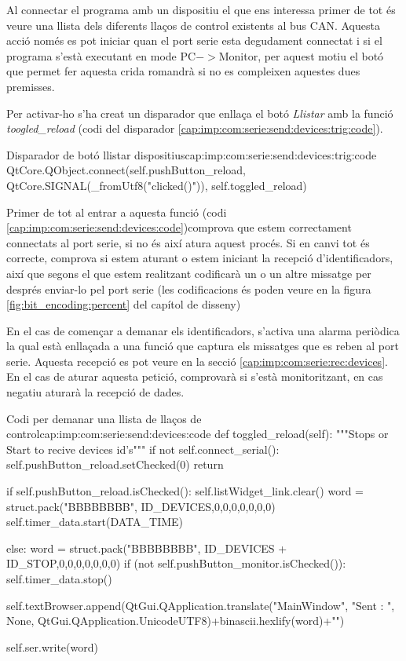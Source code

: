 Al connectar el programa \DCSMonitor amb un dispositiu \Monitor el que ens interessa primer de tot és veure una llista dels diferents llaços de control existents al bus CAN. Aquesta acció només es pot iniciar quan el port serie esta degudament connectat i si el programa s'està executant en mode PC$->$Monitor, per aquest motiu el botó que permet fer aquesta crida romandrà si no es compleixen aquestes dues premisses.

Per activar-ho s'ha creat un disparador que enllaça el botó \emph{Llistar} amb la funció \emph{toogled\_reload} (codi del disparador \ref{cap:imp:com:serie:send:devices:trig:code}).

\begin{code_python}{Disparador de botó llistar dispositius}{cap:imp:com:serie:send:devices:trig:code}
QtCore.QObject.connect(self.pushButton_reload, QtCore.SIGNAL(_fromUtf8("clicked()")), self.toggled_reload)
\end{code_python}

Primer de tot al entrar a aquesta funció (codi \ref{cap:imp:com:serie:send:devices:code})comprova que estem correctament connectats al port serie, si no és així atura aquest procés. Si en canvi tot és correcte, comprova si estem aturant o estem iniciant la recepció d'identificadors, així que segons el que estem realitzant codificarà un o un altre missatge per després enviar-lo pel port serie (les codificacions és poden veure en la figura \ref{fig:bit_encoding:percent} del capítol de disseny)

En el cas de començar a demanar els identificadors, s'activa una alarma periòdica la qual està enllaçada a una funció que captura els missatges que es reben al port serie. Aquesta recepció es pot veure en la secció \ref{cap:imp:com:serie:rec:devices}.
En el cas de aturar aquesta petició, comprovarà si s'està monitoritzant, en cas negatiu aturarà la recepció de dades.

\begin{code_python}{Codi per demanar una llista de llaços de control}{cap:imp:com:serie:send:devices:code}
def toggled_reload(self):
    """Stops or Start to recive devices id's"""
    if not self.connect_serial():
        self.pushButton_reload.setChecked(0)
        return
        
    if self.pushButton_reload.isChecked():
        self.listWidget_link.clear()
        word = struct.pack("BBBBBBBB", ID_DEVICES,0,0,0,0,0,0,0)
        self.timer_data.start(DATA_TIME)
        
    else:
        word = struct.pack("BBBBBBBB", ID_DEVICES + ID_STOP,0,0,0,0,0,0,0)
        if (not self.pushButton_monitor.isChecked()):
            self.timer_data.stop()
        
    self.textBrowser.append(QtGui.QApplication.translate("MainWindow", "Sent : ", None, QtGui.QApplication.UnicodeUTF8)+binascii.hexlify(word)+"\n")
    
    self.ser.write(word)
\end{code_python}





